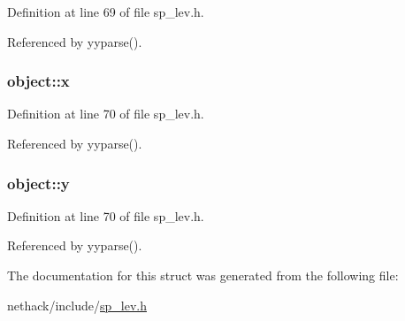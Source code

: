Definition at line 69 of file sp\+\_\+lev.\+h.



Referenced by yyparse().

\hypertarget{structobject_a33ab5ab578cd508e56751a631c232844}{
\subsubsection[{x}]{ object\+::x}}\label{structobject_a33ab5ab578cd508e56751a631c232844}


Definition at line 70 of file sp\+\_\+lev.\+h.



Referenced by yyparse().

\hypertarget{structobject_ae2675b3ffe08b822d9e74e97fa663a39}{
\subsubsection[{y}]{ object\+::y}}\label{structobject_ae2675b3ffe08b822d9e74e97fa663a39}


Definition at line 70 of file sp\+\_\+lev.\+h.



Referenced by yyparse().



The documentation for this struct was generated from the following file\+:\begin{DoxyCompactItemize}
\item 
nethack/include/\hyperlink{sp__lev_8h}{sp\+\_\+lev.\+h}\end{DoxyCompactItemize}
